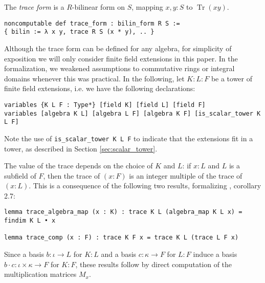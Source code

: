\documentclass{lipics-v2021}
\newcommand{\lean}[1]{\texttt{#1}\xspace} %
\DeclareMathOperator{\Tr}{\mathrm{Tr}}
\begin{document}
The \emph{trace form} is a $R$-bilinear form on $S$, mapping $x, y : S$ to $\Tr(xy)$.
\begin{lstlisting}
noncomputable def trace_form : bilin_form R S :=
{ bilin := λ x y, trace R S (x * y), .. }
\end{lstlisting}

Although the trace form can be defined for any algebra,
for simplicity of exposition we will only consider finite field extensions in this paper.
In the formalization, we weakened assumptions to commutative rings or integral domains whenever this was practical.
In the following, let $K : L : F$ be a tower of finite field extensions,
i.e. we have the following declarations:
\begin{lstlisting}
variables {K L F : Type*} [field K] [field L] [field F]
variables [algebra K L] [algebra L F] [algebra K F] [is_scalar_tower K L F]
\end{lstlisting}
Note the use of \lean{is\_scalar\_tower K L F} to indicate that the extensions fit in a tower, as described in Section \ref{sec:scalar_tower}.

The value of the trace depends on the choice of $K$ and $L$: if $x : L$ and $L$ is a subfield of $F$,
then the trace of $(x : F)$ is an integer multiple of the trace of $(x : L)$.
This is a consequence of the following two results, formalizing \cite{Neukirch}, corollary 2.7:
\begin{lstlisting}
lemma trace_algebra_map (x : K) : trace K L (algebra_map K L x) = findim K L • x

lemma trace_comp (x : F) : trace K F x = trace K L (trace L F x)
\end{lstlisting}
Since a basis $b : \iota \to L$ for $K : L$ and a basis $c : \kappa \to F$ for $L : F$ induce a basis $b \cdot c : \iota \times \kappa \to F$ for $K : F$,
these results follow by direct computation of the multiplication matrices $M_x$.
\end{document}
